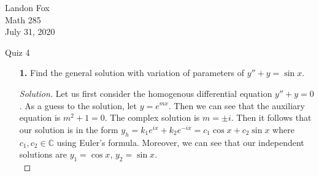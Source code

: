 \documentclass[ 12pt ]{article}
\begin{document}
\noindent Landon Fox \\
\noindent Math 285 \\
\noindent July 31, 2020

\begin{center}
\Large Quiz 4
\end{center}

\begin{enumerate}
	\item[\textbf{1.}] Find the general solution with variation of parameters of $y'' + y = \sin x$.

		\begin{proof}[Solution]\renewcommand{\qedsymbol}{}
			Let us first consider the homogenous differential equation $y'' + y = 0$. As a guess to the solution, let $y = e^{mx}$. Then we can see that the auxiliary
			equation is $m^2 + 1 = 0$. The complex solution is $m = \pm i$. Then it follows that our solution is in the form $y_h = k_1e^{ix} + k_2e^{-ix} = c_1 \cos x + c_2 \sin x$
			where $c_1, c_2 \in \mathbb{C}$ using Euler's formula. Moreover, we can see that our independent solutions are $y_1 = \cos x$, $y_2 = \sin x$. \\


\end{proof}
\end{enumerate}
\end{document}
